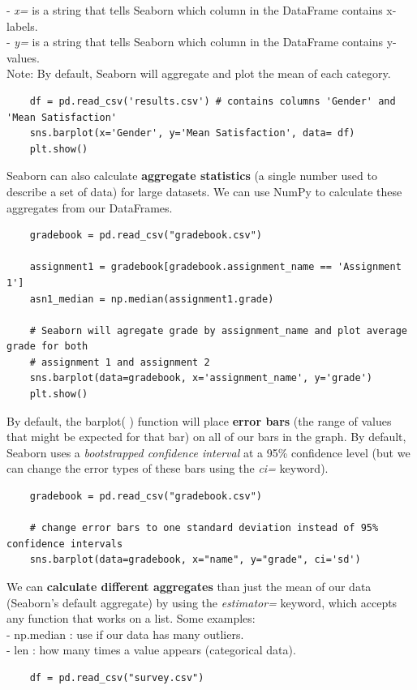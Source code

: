 \documentclass[11pt, a4paper]{article}
\begin{document}
\begin{spacing}{1.1}
	\hspace*{3mm} - \textit{x=} is a string that tells Seaborn which column in the DataFrame contains x-labels. \\
	\hspace*{3mm} - \textit{y=} is a string that tells Seaborn which column in the DataFrame contains y-values. \\ 
	Note: By default, Seaborn will aggregate and plot the mean of each category. 
	\begin{lstlisting}
	df = pd.read_csv('results.csv') # contains columns 'Gender' and 'Mean Satisfaction'
	sns.barplot(x='Gender', y='Mean Satisfaction', data= df)
	plt.show()\end{lstlisting}\vspace*{1mm}
	Seaborn can also calculate \textbf{aggregate statistics} (a single number used to describe a set of data) for large datasets. We can use NumPy to calculate these aggregates from our DataFrames. 
	\begin{lstlisting}
	gradebook = pd.read_csv("gradebook.csv")
	
	assignment1 = gradebook[gradebook.assignment_name == 'Assignment 1']
	asn1_median = np.median(assignment1.grade)	
	
	# Seaborn will agregate grade by assignment_name and plot average grade for both 
	# assignment 1 and assignment 2
	sns.barplot(data=gradebook, x='assignment_name', y='grade')
	plt.show()\end{lstlisting}\vspace*{1mm}
	By default, the barplot( ) function will place \textbf{error bars} (the range of values that might be expected for that bar) on all of our bars in the graph. By default, Seaborn uses a \textit{bootstrapped confidence interval} at a 95\% confidence level (but we can change the error types of these bars using the \textit{ci=} keyword). 
	\begin{lstlisting}
	gradebook = pd.read_csv("gradebook.csv")
	
	# change error bars to one standard deviation instead of 95% confidence intervals
	sns.barplot(data=gradebook, x="name", y="grade", ci='sd')\end{lstlisting}\vspace*{1mm}
	We can \textbf{calculate different aggregates} than just the mean of our data (Seaborn's default aggregate) by using the \textit{estimator=} keyword, which accepts any function that works on a list. Some examples: \\
	\hspace*{3mm} - np.median : use if our data has many outliers. \\
	\hspace*{3mm} - len : how many times a value appears (categorical data). 
	\begin{lstlisting}
	df = pd.read_csv("survey.csv")
	

\end{lstlisting}
\end{spacing}
\end{document}
